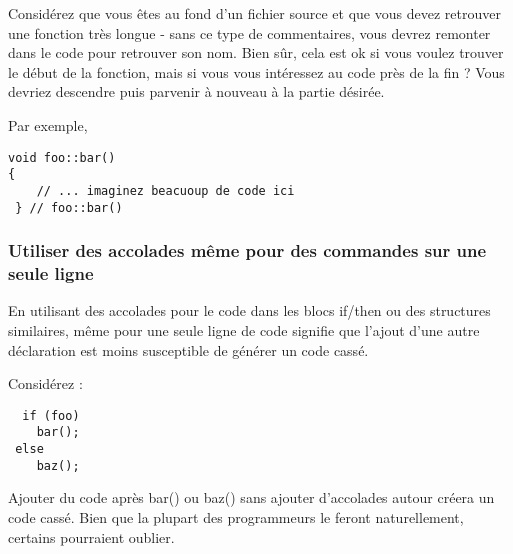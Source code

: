Considérez que vous êtes au fond d'un fichier source et que vous devez retrouver une fonction très longue - sans ce type de commentaires, vous devrez remonter dans le code pour retrouver son nom. Bien sûr, cela est ok si vous voulez trouver le début de la fonction, mais si vous vous intéressez au code près de la fin ? Vous devriez descendre puis parvenir à nouveau à la partie désirée.

Par exemple,

\begin{verbatim}
void foo::bar()
{ 
    // ... imaginez beacuoup de code ici
 } // foo::bar()
\end{verbatim}

\subsubsection{Utiliser des accolades même pour des commandes sur une seule ligne}
En utilisant des accolades pour le code dans les blocs if/then ou des structures similaires, même pour une seule ligne de code signifie que l'ajout d'une autre déclaration est moins susceptible de générer un code cassé.

Considérez :

\begin{verbatim}
  if (foo)
    bar();
 else
    baz();
\end{verbatim}

Ajouter du code après bar() ou baz() sans ajouter d'accolades autour créera un code cassé. Bien que la plupart des programmeurs le feront naturellement, certains pourraient oublier.

